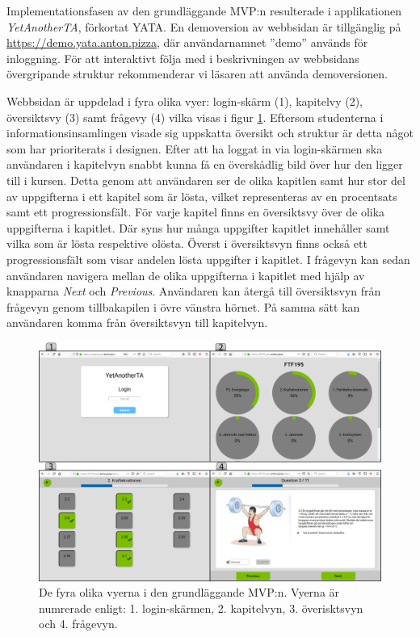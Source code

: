 Implementationsfasen av den grundläggande MVP:n resulterade i applikationen \emph{YetAnotherTA}, förkortat YATA. En demoversion av webbsidan är tillgänglig på \url{https://demo.yata.anton.pizza}, där användarnamnet ''demo'' används för inloggning. För att interaktivt följa med i beskrivningen av webbsidans övergripande struktur rekommenderar vi läsaren att använda demoversionen. 

Webbsidan är uppdelad i fyra olika vyer: login-skärm (1), kapitelvy (2), översiktsvy (3) samt frågevy (4) vilka visas i figur \ref{fig:raket4}. Eftersom studenterna i informationsinsamlingen visade sig uppskatta översikt och struktur är detta något som har prioriterats i designen. Efter att ha loggat in via login-skärmen ska användaren i kapitelvyn snabbt kunna få en överskådlig bild över hur den ligger till i kursen. Detta genom att användaren ser de olika kapitlen samt hur stor del av uppgifterna i ett kapitel som är lösta, vilket representeras av en procentsats samt ett progressionsfält. För varje kapitel finns en översiktsvy över de olika uppgifterna i kapitlet. Där syns hur många uppgifter kapitlet innehåller samt vilka som är lösta respektive olösta. Överst i översiktsvyn finns också ett progressionsfält som visar andelen lösta uppgifter i kapitlet. I frågevyn kan sedan användaren navigera mellan de olika uppgifterna i kapitlet med hjälp av knapparna \emph{Next} och \emph{Previous}. Användaren kan återgå till översiktsvyn från frågevyn genom tillbakapilen i övre vänstra hörnet. På samma sätt kan användaren komma från översiktsvyn till kapitelvyn. 

\begin{figure}[hbtp]
    \centering
    \includegraphics[width=1.0\textwidth]{images/resultpictures/4pics1website.png}
    \caption{De fyra olika vyerna i den grundläggande MVP:n. Vyerna är numrerade enligt: 1. login-skärmen, 2. kapitelvyn, 3. överisktsvyn och 4. frågevyn. }
    \label{fig:raket4}
\end{figure}

